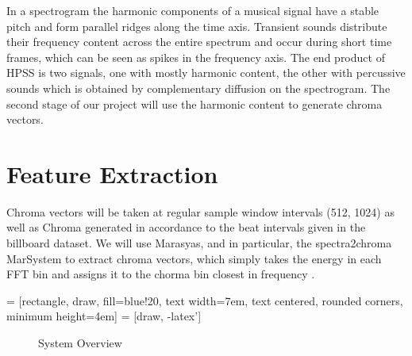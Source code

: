 \documentclass{article}
\begin{document}
In a spectrogram the harmonic components of a musical signal have a stable
pitch and form parallel ridges along the time axis. Transient sounds distribute
their frequency content across the entire spectrum and occur during short time
frames, which can be seen as spikes in the frequency axis. The end product of
HPSS is two signals, one with mostly harmonic content, the other with
percussive sounds which is obtained by complementary diffusion on the
spectrogram. The second stage of our project will use the harmonic content to
generate chroma vectors.\newline

\section{Feature Extraction}

Chroma vectors will be taken at regular sample window intervals (512, 1024) as well as Chroma generated in accordance to the beat intervals given in the billboard dataset.  We will use Marasyas, and in particular, the spectra2chroma MarSystem to extract chroma vectors, which simply takes the energy in each FFT bin and assigns it to the chorma bin closest in frequency . \newline

 = [rectangle, draw, fill=blue!20,
    text width=7em, text centered, rounded corners, minimum height=4em]
 = [draw, -latex']

\begin{figure}
\caption{System Overview}
\end{figure}
\end{document}
